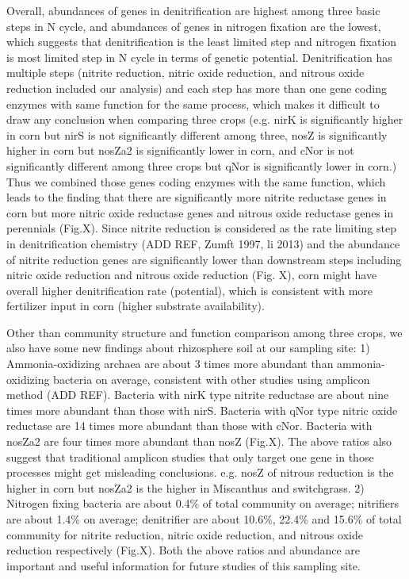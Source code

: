 \documentclass[12pt]{article}
\begin{document}
Overall, abundances of genes in denitrification are highest among three basic steps in N cycle, and abundances of genes in nitrogen fixation are the lowest, which suggests that denitrification is the least limited step and nitrogen fixation is most limited step in N cycle in terms of genetic potential. Denitrification has multiple steps (nitrite reduction, nitric oxide reduction, and nitrous oxide reduction included our analysis) and each step has more than one gene coding enzymes with same function for the same process, which makes it difficult to draw any conclusion when comparing three crops (e.g. nirK is significantly higher in corn but nirS is not significantly different among three, nosZ is significantly higher in corn but nosZa2 is significantly lower in corn, and cNor is not significantly different among three crops but qNor is significantly lower in corn.) Thus we combined those genes coding enzymes with the same function, which leads to the finding that there are significantly more nitrite reductase genes in corn but more nitric oxide reductase genes and nitrous oxide reductase genes in perennials (Fig.X). Since nitrite reduction is considered as the rate limiting step in denitrification chemistry (ADD REF, Zumft 1997, li 2013) and the abundance of nitrite reduction genes are significantly lower than downstream steps including nitric oxide reduction and nitrous oxide reduction (Fig. X), corn might have overall higher denitrification rate (potential), which is consistent with more fertilizer input in corn (higher substrate availability).

Other than community structure and function comparison among three crops, we also have some new findings about rhizosphere soil at our sampling site: 1) Ammonia-oxidizing archaea are about 3 times more abundant than ammonia-oxidizing bacteria on average, consistent with other studies using amplicon method (ADD REF). Bacteria with nirK type nitrite reductase are about nine times more abundant than those with nirS. Bacteria with qNor type nitric oxide reductase are 14 times more abundant than those with cNor. Bacteria with nosZa2 are four times more abundant than nosZ (Fig.X). The above ratios also suggest that traditional amplicon studies that only target one gene in those processes might get misleading conclusions. e.g. nosZ of nitrous reduction is the higher in corn but nosZa2 is the higher in Miscanthus and switchgrass. 2) Nitrogen fixing bacteria are about 0.4\% of total community on average; nitrifiers are about 1.4\% on average; denitrifier are about 10.6\%, 22.4\% and 15.6\% of total community for nitrite reduction, nitric oxide reduction, and nitrous oxide reduction respectively (Fig.X). Both the above ratios and abundance are important and useful information for future studies of this sampling site.
\end{document}
